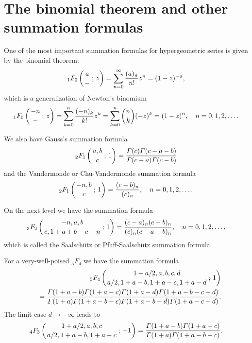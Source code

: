 \documentclass[envcountchap,graybox]{svmono}
\newcommand{\hyp}[5]{\mbox{}_{#1}{F}_{#2}
\left(\genfrac{}{}{0pt}{}{#3}{#4}\,;\,#5\right)}
\renewcommand{\Gamma}{\varGamma}
\begin{document}
\section{The binomial theorem and other summation formulas}
\par\setcounter{equation}{0}
\label{summation formulas}

One of the most important summation formulas for hypergeometric series is
given by the binomial theorem:
\begin{equation}
\label{binomial}\index{Binomial theorem}\index{Summation formula!Binomial theorem}
\hyp{1}{0}{a}{-}{z}=\sum_{n=0}^{\infty}\frac{(a)_n}{n!}z^n=(1-z)^{-a},
\end{equation}
which is a generalization of Newton's binomium
\begin{equation}
\label{Newton}
\hyp{1}{0}{-n}{-}{z}=\sum_{k=0}^n\frac{(-n)_k}{k!}z^k
=\sum_{k=0}^n\binom{n}{k}(-z)^k=(1-z)^n,\quad n=0,1,2,\ldots.
\end{equation}

We also have Gauss's summation formula
\begin{equation}
\label{Gauss}\index{Gauss summation formula}\index{Summation formula!Gauss}
\hyp{2}{1}{a,b}{c}{1}=
\frac{\Gamma(c)\Gamma(c-a-b)}{\Gamma(c-a)\Gamma(c-b)}
\end{equation}
and the Vandermonde or Chu-Vandermonde summation formula
\begin{equation}
\label{ChuVandermonde}
\index{Vandermonde summation formula}\index{Summation formula!Vandermonde}
\index{Chu-Vandermonde summation formula}\index{Summation formula!Chu-Vandermonde}
\hyp{2}{1}{-n,b}{c}{1}=\frac{(c-b)_n}{(c)_n},\quad n=0,1,2,\ldots.
\end{equation}

On the next level we have the summation formula
\begin{equation}
\label{PfaffSaalschutz}
\index{Saalsch\"{u}tz summation formula}\index{Summation formula!Saalsch\"{u}tz}
\index{Pfaff-Saalsch\"{u}tz summation formula}\index{Summation formula!Pfaff-Saalsch\"{u}tz}
\hyp{3}{2}{-n,a,b}{c,1+a+b-c-n}{1}=\frac{(c-a)_n(c-b)_n}{(c)_n(c-a-b)_n},
\quad n=0,1,2,\ldots,
\end{equation}
which is called the Saalsch\"{u}tz or Pfaff-Saalsch\"{u}tz summation formula.

For a very-well-poised ${}_5F_4$ we have the summation formula
\begin{eqnarray}
\label{wellpoised}\index{Summation formula!for a very-well-poised ${}_5F_4$}
& &\hyp{5}{4}{1+a/2,a,b,c,d}{a/2,1+a-b,1+a-c,1+a-d}{1}\nonumber\\
& &{}=\frac{\Gamma(1+a-b)\Gamma(1+a-c)\Gamma(1+a-d)\Gamma(1+a-b-c-d)}
{\Gamma(1+a)\Gamma(1+a-b-c)\Gamma(1+a-b-d)\Gamma(1+a-c-d)}.
\end{eqnarray}
The limit case $d\rightarrow -\infty$ leads to
\begin{equation}
\label{wellpoisedlimit}
\hyp{4}{3}{1+a/2,a,b,c}{a/2,1+a-b,1+a-c}{-1}
=\frac{\Gamma(1+a-b)\Gamma(1+a-c)}{\Gamma(1+a)\Gamma(1+a-b-c)}.
\end{equation}
\end{document}
